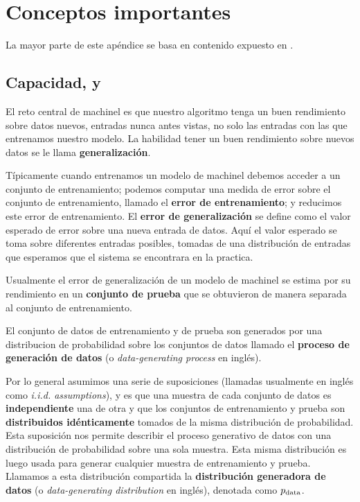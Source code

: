 \chapter{Conceptos importantes} %
\label{appendix:keyconcepts} %

La mayor parte de este apéndice se basa en contenido expuesto en \cite{deeplearning}.

\section{Capacidad,  y }
El reto central de \gls{machinel} es que nuestro algoritmo tenga un buen rendimiento sobre datos nuevos, entradas nunca antes vistas, no solo las entradas con las que entrenamos nuestro modelo. La habilidad tener un buen rendimiento sobre nuevos datos se le llama \textbf{generalización}.

Típicamente cuando entrenamos un modelo de \gls{machinel} debemos acceder a un conjunto de entrenamiento; podemos computar una medida de error sobre el conjunto de entrenamiento, llamado el \textbf{error de entrenamiento}; y reducimos este error de entrenamiento. El \textbf{error de generalización} se define como el valor esperado de error sobre una nueva entrada de datos. Aquí el valor esperado se toma sobre diferentes entradas posibles, tomadas de una distribución de entradas que esperamos que el sistema se encontrara en la practica.

Usualmente el error de generalización de un modelo de \gls{machinel} se estima por su rendimiento en un \textbf{conjunto de prueba} que se obtuvieron de manera separada al conjunto de entrenamiento.

El conjunto de datos de entrenamiento y de prueba son generados por una distribucion de probabilidad sobre los conjuntos de datos llamado el \textbf{proceso de generación de datos} (o \textsl{data-generating process} en inglés).

Por lo general asumimos una serie de suposiciones (llamadas usualmente en inglés como \textsl{i.i.d. assumptions}), y es que una muestra de cada conjunto de datos es \textbf{independiente} una de otra y que los conjuntos de entrenamiento y prueba son \textbf{distribuidos idénticamente} tomados de la misma distribución de probabilidad. Esta suposición nos permite describir el proceso generativo de datos con una distribución de probabilidad sobre una sola muestra. Esta misma distribución es luego usada para generar cualquier muestra de entrenamiento y prueba. Llamamos a esta distribución compartida la \textbf{distribución generadora de datos} (o \textsl{data-generating distribution} en inglés), denotada como $p_{\rm{data}}$.

